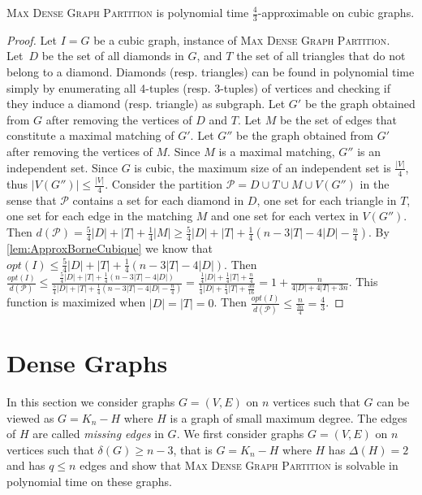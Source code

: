 \documentclass[a4paper,USenglish,cleveref, autoref]{lipics-v2021}
\newcommand\MDGP{\textsc{Max Dense Graph Partition}}
\begin{document}
\begin{theorem}
\MDGP{} is polynomial time $\frac{4}{3}$-approximable on cubic graphs.
\end{theorem}
\begin{proof}
	Let $I=G$ be a cubic graph, instance of \MDGP{}. Let~$D$ be the set of all diamonds in $G$, and $T$ the set of all triangles  that do not belong to a diamond.
	Diamonds (resp. triangles) can be found in polynomial time simply by enumerating all 4-tuples (resp. 3-tuples) of vertices and checking if they induce a diamond (resp. triangle) as subgraph. %
	Let $G'$   be the graph obtained from $G$ after removing the vertices of $D$ and $T$. Let $M$ be the set of edges  that constitute a maximal matching of $G'$. Let $G''$ be the graph obtained from $G'$ after removing the vertices of $M$. Since $M$ is a maximal matching, $G''$ is an independent set. Since $G$ is cubic, the maximum size of an independent set is $\frac{|V|}{4}$, thus $|V(G'')| \leq \frac{|V|}{4}$.
	 Consider the partition $\mathcal{P} = D \cup T \cup M \cup V(G'')$ in the sense that $\mathcal{P}$ contains a set for each diamond in $D$, one set for each triangle in $T$, one set for each edge in the matching $M$ and one set for each vertex in $V(G'')$.
	  Then $d(\mathcal{P}) = \frac{5}{4}|D| + |T| + \frac{1}{4} |M| \geq \frac{5}{4}|D| + |T| + \frac{1}{4}(n - 3|T| - 4|D| - \frac{n}{4})$. By \autoref{lem:ApproxBorneCubique} we know that $opt(I) \leq \frac{5}{4}|D| + |T| + \frac{1}{4}(n - 3|T| - 4|D|)$. Then $\frac{opt(I)}{d(\mathcal{P})} \leq \frac{\frac{5}{4}|D| + |T| + \frac{1}{4}(n - 3|T| - 4|D|)}{\frac{5}{4}|D| + |T| + \frac{1}{4}(n - 3|T| - 4|D| - \frac{n}{4})} = \frac{\frac{1}{4}|D| + \frac{1}{4}|T| + \frac{n}{4}}{\frac{1}{4}|D| + \frac{1}{4}|T| + \frac{3n}{16}} = 1+\frac{{n}}{4|D|+4|T|+{3n}}$. This function is maximized when $|D| = |T| = 0$. Then $\frac{opt(I)}{d(\mathcal{P})} \leq \frac{n}{\frac{3n}{4}} = \frac{4}{3}$.
\end{proof}

 \section{Dense Graphs}\label{sec5}
 \label{sec:densGrapheDensite}
 In this section we consider graphs $G=(V,E)$ on $n$ vertices such that $G$ can be viewed as $G=K_n-H$ where $H$ is a graph of small maximum degree. The edges of $H$ are called \emph{missing edges} in $G$. We first consider graphs $G=(V,E)$ on $n$ vertices such that $\delta(G) \geq n-3$, that is  $G=K_n-H$ where $H$ has $\Delta(H)=2$  and has $q\leq n$ edges and show that \MDGP{} is solvable in polynomial time on these graphs. 
 
\end{document}

